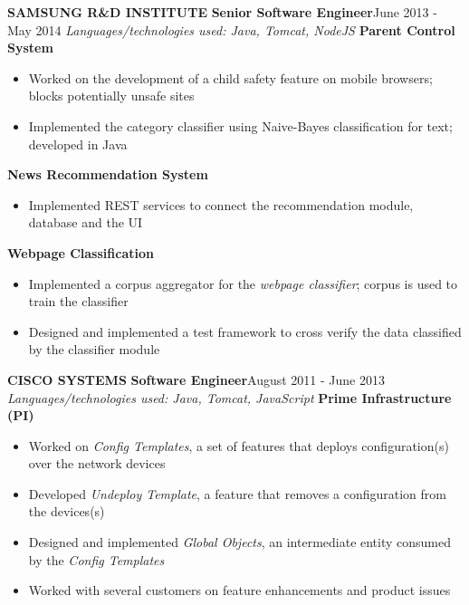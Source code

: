 \documentclass[11pt, letterpaper]{article}
\begin{document}
\begin{multicols}{2}
			\vspace{0.2cm}
			{\bfseries SAMSUNG R\&D INSTITUTE}\newline
			{\bfseries \small Senior Software Engineer}\hfill{June 2013 - May 2014}\newline
				\textit{Languages/technologies used: Java, Tomcat, NodeJS}\newline
				{\bfseries Parent Control System}
				\begin{itemize}[nolistsep,leftmargin=*]
					\item Worked on the development of a child safety feature on mobile browsers; blocks potentially unsafe sites
					\item Implemented the category classifier using Naive-Bayes classification for text; developed in Java
				\end{itemize}
				{\bfseries News Recommendation System}
				\begin{itemize}[nolistsep,leftmargin=*]
					\item Implemented REST services to connect the recommendation module, database and the UI
				\end{itemize}
				{\bfseries Webpage Classification}
				\begin{itemize}[nolistsep,leftmargin=*]
					\item Implemented a corpus aggregator for the \textit{webpage classifier}; corpus is used to train the classifier
					\item Designed and implemented a test framework to cross verify the data classified by the classifier module
				\end{itemize}
			\vspace{0.3cm}

			\columnbreak 
			{\bfseries CISCO SYSTEMS}\newline
			{\bfseries \small Software Engineer}\hfill{August 2011 - June 2013}\newline			
				\textit{Languages/technologies used: Java, Tomcat, JavaScript}\newline
				{\bfseries Prime Infrastructure (PI)}
				\begin{itemize}[nolistsep,leftmargin=*]
					\item Worked on \textit{Config Templates}, a set of features that deploys configuration(s) over the network devices
					\item Developed \textit{Undeploy Template}, a feature that removes a configuration from the devices(s)
					\item Designed and implemented \textit{Global Objects}, an intermediate entity consumed by the \textit{Config Templates}
					\item Worked with several customers on feature enhancements and product issues
				\end{itemize}
				


\end{multicols}
\end{document}

